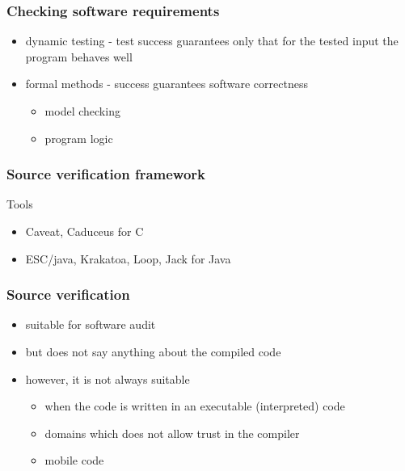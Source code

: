 \documentclass{beamer}
\begin{document}
\begin{frame}[shrink]
\frametitle{Checking software requirements}
\begin{itemize}
  \item dynamic testing  - test success guarantees only that for the tested input the program behaves well
  \item formal methods -  success guarantees software correctness  
    \begin{itemize}
      \item  model checking
       \item program logic
     \end{itemize}
\end{itemize}
\end{frame}


\begin{frame}[shrink]
\frametitle{Source verification framework}
 
\begin{center}
\end{center}
Tools 
\begin{itemize}
  \item Caveat,  Caduceus for C
  \item ESC/java, Krakatoa,  Loop,  Jack for Java 
 
\end{itemize}
 \end{frame}

\begin{frame}[shrink]
\frametitle{Source verification }
\begin{itemize}
  \item suitable for software audit
  \item but does not say anything about the compiled code
   \item however, it is not always suitable
     \begin{itemize}
          \item when the code is written in an executable (interpreted) code
          \item domains which does not allow trust in the compiler 
          \item mobile code  
     \end{itemize} 
\end{itemize}
 
 
\end{frame}
\end{document}

